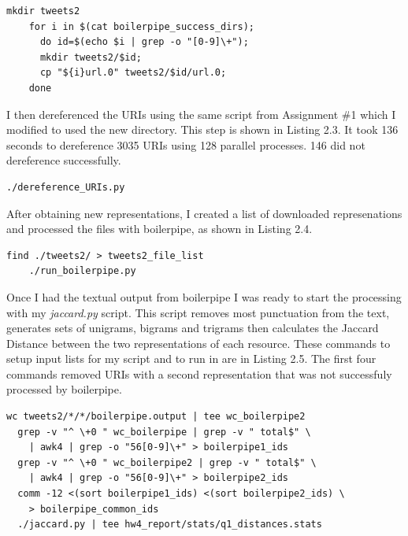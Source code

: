 \documentclass[a4paper,12pt]{article}
\begin{document}
\begin{lstlisting}[basicstyle=\ttfamily,caption={Creating Second Tweets Directory}]
    mkdir tweets2
    for i in $(cat boilerpipe_success_dirs);
      do id=$(echo $i | grep -o "[0-9]\+");
      mkdir tweets2/$id;
      cp "${i}url.0" tweets2/$id/url.0;
    done
\end{lstlisting}

I then dereferenced the URIs using the same script from Assignment \#1 which I modified to
used the new directory\cite{hw1}. This step is shown in Listing 2.3. It took 136 seconds to dereference
3035 URIs using 128 parallel processes. 146 did not dereference successfully.

\begin{lstlisting}[basicstyle=\ttfamily,caption={Dereferencing URIs}]
    ./dereference_URIs.py
\end{lstlisting}

After obtaining new representations, I created a list of downloaded represenations and processed the files
with boilerpipe, as shown in Listing 2.4.

\begin{lstlisting}[basicstyle=\ttfamily,caption={Extracting Text with Boilerpipe}]
    find ./tweets2/ > tweets2_file_list
    ./run_boilerpipe.py
\end{lstlisting}

Once I had the textual output from boilerpipe I was ready to start the processing with my \emph{jaccard.py}
script. This script removes most punctuation from the text, generates sets of unigrams, bigrams and trigrams
then calculates the Jaccard Distance between the two representations of each resource\cite{wiki:jaccard}.
These commands to
setup input lists for my script and to run in are in Listing 2.5. The first four commands removed
URIs with a second representation that was not successfuly processed by boilerpipe.

\begin{lstlisting}[basicstyle=\ttfamily,caption={Calculating Jaccard Distance}]
  wc tweets2/*/*/boilerpipe.output | tee wc_boilerpipe2
  grep -v "^ \+0 " wc_boilerpipe | grep -v " total$" \
    | awk4 | grep -o "56[0-9]\+" > boilerpipe1_ids
  grep -v "^ \+0 " wc_boilerpipe2 | grep -v " total$" \
    | awk4 | grep -o "56[0-9]\+" > boilerpipe2_ids
  comm -12 <(sort boilerpipe1_ids) <(sort boilerpipe2_ids) \
    > boilerpipe_common_ids
  ./jaccard.py | tee hw4_report/stats/q1_distances.stats
\end{lstlisting}
\end{document}
